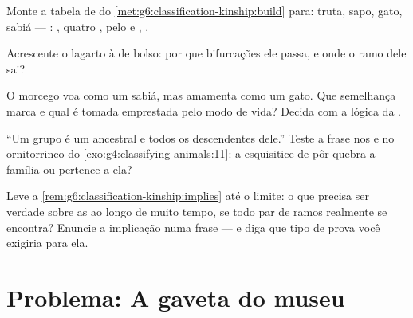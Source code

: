 \begin{exercise}[$\star\star$]\label{exo:g6:classification-kinship:8}
Monte a tabela de  do
\cref{met:g6:classification-kinship:build} para: truta, sapo, gato,
sabiá --- : , quatro , pelo e ,
.
\end{exercise}

\begin{exercise}[$\star\star$]\label{exo:g6:classification-kinship:9}
Acrescente o lagarto à  de bolso: por que bifurcações ele passa,
e onde o ramo dele sai?
\end{exercise}

\begin{exercise}[$\star\star$]\label{exo:g6:classification-kinship:10}
O morcego voa como um sabiá, mas amamenta como um gato. Que semelhança
marca  e qual é tomada emprestada pelo modo de vida? Decida
com a lógica da .
\end{exercise}

\begin{exercise}[$\star\star$]\label{exo:g6:classification-kinship:11}
``Um grupo é um ancestral e todos os descendentes dele.'' Teste a
frase nos  e no ornitorrinco do
\cref{exo:g4:classifying-animals:11}: a esquisitice de pôr  quebra
a família ou pertence a ela?
\end{exercise}

\begin{exercise}[$\star\star\star$]\label{exo:g6:classification-kinship:12}
Leve a \cref{rem:g6:classification-kinship:implies} até o limite: o
que precisa ser verdade sobre as  ao longo de muito tempo, se
todo par de ramos realmente se encontra? Enuncie a implicação numa
frase --- e diga que tipo de prova você exigiria para ela.
\end{exercise}

\section{Problema: A gaveta do museu}

